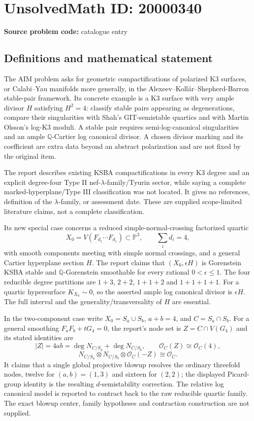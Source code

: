 \documentclass[11pt]{article}
\newcommand{\Q}{\mathbb{Q}}
\newcommand{\PP}{\mathbb{P}}
\begin{document}
\section*{UnsolvedMath ID: 20000340}
\textbf{Source problem code:} catalogue entry
\subsection{Definitions and mathematical statement}
The AIM problem asks for geometric compactifications of polarized K3 surfaces, or Calabi--Yau manifolds more generally, in the Alexeev--Koll\'ar--Shepherd-Barron stable-pair framework. Its concrete example is a K3 surface with very ample divisor $H$ satisfying $H^2=4$: classify stable pairs appearing as degenerations, compare their singularities with Shah's GIT-semistable quartics and with Martin Olsson's log-K3 moduli. A stable pair requires semi-log-canonical singularities and an ample $\Q$-Cartier log canonical divisor. A chosen divisor marking and its coefficient are extra data beyond an abstract polarization and are not fixed by the original item.

The report describes existing KSBA compactifications in every K3 degree and an explicit degree-four Type II nef-$\lambda$-family/Tyurin sector, while saying a complete marked-hyperplane/Type III classification was not located. It gives no references, definition of the $\lambda$-family, or assessment date. These are supplied scope-limited literature claims, not a complete classification.

Its new special case concerns a reduced simple-normal-crossing factorized quartic
\[
 X_0=V(F_{d_1}\cdots F_{d_s})\subset\PP^3,\qquad
 \sum_i d_i=4,
\]
with smooth components meeting with simple normal crossings, and a general Cartier hyperplane section $H$. The report claims that $(X_0,\epsilon H)$ is Gorenstein KSBA stable and $\Q$-Gorenstein smoothable for every rational $0<\epsilon\leq1$. The four reducible degree partitions are $1+3$, $2+2$, $1+1+2$ and $1+1+1+1$. For a quartic hypersurface $K_{X_0}\sim0$, so the asserted ample log canonical divisor is $\epsilon H$. The full interval and the generality/transversality of $H$ are essential.

In the two-component case write $X_0=S_a\cup S_b$, $a+b=4$, and $C=S_a\cap S_b$. For a general smoothing $F_aF_b+tG_4=0$, the report's node set is $Z=C\cap V(G_4)$ and its stated identities are
\[
 |Z|=4ab=\deg N_{C/S_a}+\deg N_{C/S_b},\qquad
 \mathcal O_C(Z)\cong\mathcal O_C(4),
\]
\[
 N_{C/S_a}\otimes N_{C/S_b}\otimes\mathcal O_C(-Z)\cong\mathcal O_C.
\]
It claims that a single global projective blowup resolves the ordinary threefold nodes, twelve for $(a,b)=(1,3)$ and sixteen for $(2,2)$; the displayed Picard-group identity is the resulting $d$-semistability correction. The relative log canonical model is reported to contract back to the raw reducible quartic family. The exact blowup center, family hypotheses and contraction construction are not supplied.
\end{document}
